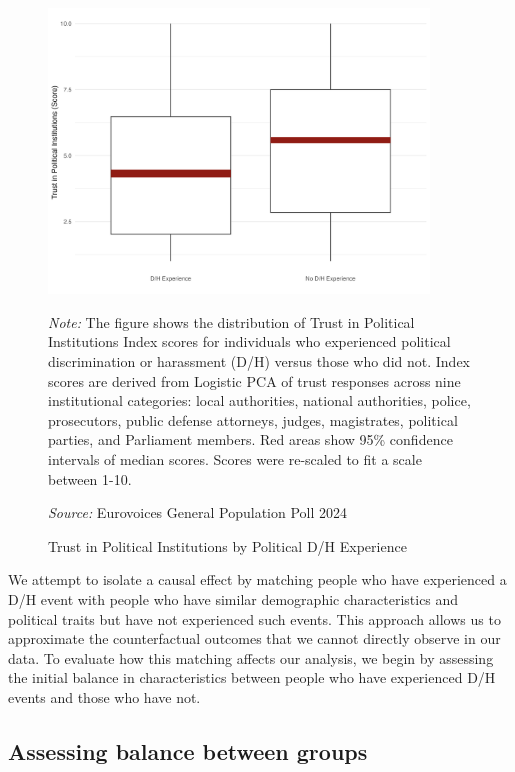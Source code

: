 \documentclass{article}
\begin{document}
\begin{figure}[htbp]
\centering
\caption{Trust in Political Institutions by Political D/H Experience}
\label{fig:1}
\includegraphics[width=0.9\textwidth]{"viz/fig_trust_comparison_naive.png"}

\medskip
\justifying\footnotesize 
\textit{Note:} The figure shows the distribution of Trust in Political Institutions Index scores for individuals who experienced political discrimination or harassment (D/H) versus those who did not. Index scores are derived from Logistic PCA of trust responses across nine institutional categories: local authorities, national authorities, police, prosecutors, public defense attorneys, judges, magistrates, political parties, and Parliament members. Red areas show 95\% confidence intervals of median scores. Scores were re-scaled to fit a scale between 1-10.

\textit{Source:} Eurovoices General Population Poll 2024
\end{figure}

We attempt to isolate a causal effect by matching people who have experienced a D/H event with people who have similar demographic characteristics and political traits but have not experienced such events. This approach allows us to approximate the counterfactual outcomes that we cannot directly observe in our data. To evaluate how this matching affects our analysis, we begin by assessing the initial balance in characteristics between people who have experienced D/H events and those who have not.

\subsection{Assessing balance between groups}
\end{document}
